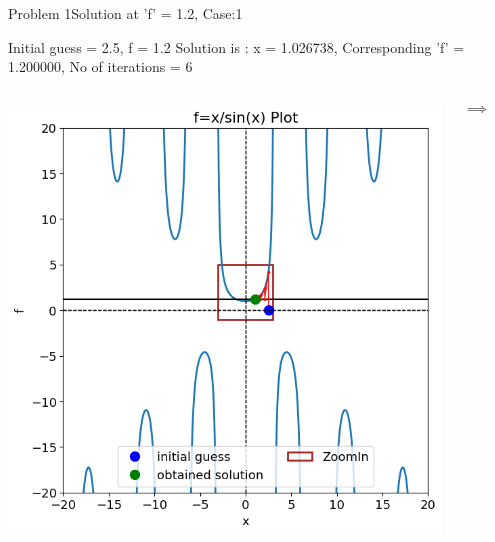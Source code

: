 \documentclass{beamer}
\begin{document}
\begin{frame}{Problem 1}{Solution at 'f' = 1.2, Case:1}
    \begin{block}{\footnotesize Initial guess = 2.5, f = 1.2}
        \footnotesize
        Solution is : x = 1.026738, Corresponding 'f' = 1.200000, No of iterations = 6
    \end{block}
    \vspace{-0.5em}
    \begin{columns}
        \begin{block}{}
            \includegraphics[width=\textwidth]{Figures/prob1_sol11.png}
        \end{block}
        \[\implies\]
        \begin{block}{}

\end{block}
\end{columns}
\end{frame}
\end{document}
